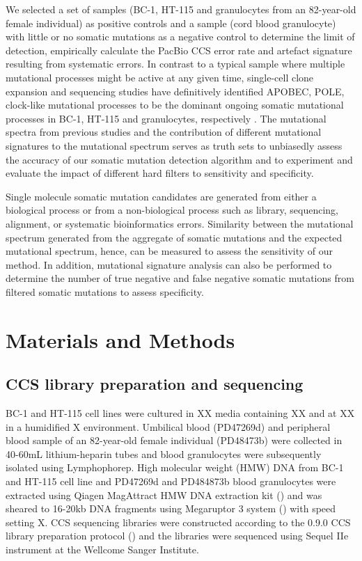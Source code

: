 We selected a set of samples (BC-1, HT-115 and granulocytes from an 82-year-old female individual) as positive controls and a sample (cord blood granulocyte) with little or no somatic mutations as a negative control to determine the limit of detection, empirically calculate the PacBio CCS error rate and artefact signature resulting from systematic errors. In contrast to a typical sample where multiple mutational processes might be active at any given time, single-cell clone expansion and sequencing studies have definitively identified APOBEC, POLE, clock-like mutational processes to be the dominant ongoing somatic mutational processes in BC-1, HT-115 and granulocytes, respectively \cite{Petljak2019-wi, Mitchell2022-ry}. The mutational spectra from previous studies and the contribution of different mutational signatures to the mutational spectrum serves as truth sets to unbiasedly assess the accuracy of our somatic mutation detection algorithm and to experiment and evaluate the impact of different hard filters to sensitivity and specificity.

Single molecule somatic mutation candidates are generated from either a biological process or from a non-biological process such as library, sequencing, alignment, or systematic bioinformatics errors. Similarity between the mutational spectrum generated from the aggregate of somatic mutations and the expected mutational spectrum, hence, can be measured to assess the sensitivity of our method. In addition, mutational signature analysis can also be performed to determine the number of true negative and false negative somatic mutations from filtered somatic mutations to assess specificity. 


\section{Materials and Methods}

\subsection{CCS library preparation and sequencing}
BC-1 and HT-115 cell lines were cultured in XX media containing XX and at XX in a humidified X environment. Umbilical blood (PD47269d) and peripheral blood sample of an 82-year-old female individual (PD48473b) were collected in 40-60mL lithium-heparin tubes and blood granulocytes were subsequently isolated using Lymphophorep. High molecular weight (HMW) DNA from BC-1 and HT-115 cell line and PD47269d and PD484873b blood granulocytes were extracted using Qiagen MagAttract HMW DNA extraction kit () and was sheared to 16-20kb DNA fragments using Megaruptor 3 system () with speed setting X. CCS sequencing libraries were constructed according to the 0.9.0 CCS library preparation protocol () and the libraries were sequenced using Sequel IIe instrument at the Wellcome Sanger Institute. 

